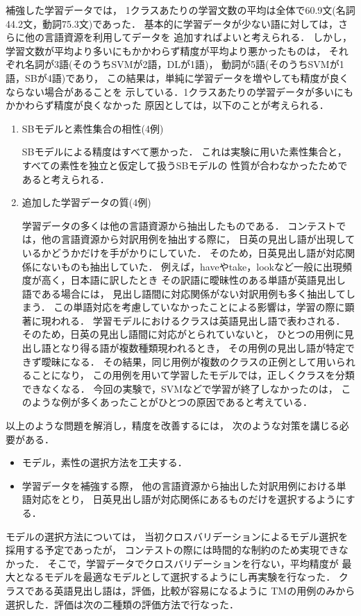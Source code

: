 補強した学習データでは，
1クラスあたりの学習文数の平均は全体で60.9文(名詞44.2文，動詞75.3文)であった．
基本的に学習データが少ない語に対しては，さらに他の言語資源を利用してデータを
追加すればよいと考えられる．
しかし，学習文数が平均より多いにもかかわらず精度が平均より悪かったものは，
それぞれ名詞が3語(そのうちSVMが2語，DLが1語)，
動詞が5語(そのうちSVMが1語，SBが4語)であり，
この結果は，単純に学習データを増やしても精度が良くならない場合があることを
示している．1クラスあたりの学習データが多いにもかかわらず精度が良くなかった
原因としては，以下のことが考えられる．
\begin{enumerate}
\item SBモデルと素性集合の相性(4例)
    
  SBモデルによる精度はすべて悪かった．
  これは実験に用いた素性集合と，すべての素性を独立と仮定して扱うSBモデルの
  性質が合わなかったためであると考えられる．

\item 追加した学習データの質(4例)

  学習データの多くは他の言語資源から抽出したものである．
  コンテストでは，他の言語資源から対訳用例を抽出する際に，
  日英の見出し語が出現しているかどうかだけを手がかりにしていた．
  そのため，日英見出し語が対応関係にないものも抽出していた．
  例えば，haveやtake，lookなど一般に出現頻度が高く，日本語に訳したとき
  その訳語に曖昧性のある単語が英語見出し語である場合には，
  見出し語間に対応関係がない対訳用例も多く抽出してしまう．
  この単語対応を考慮していなかったことによる影響は，学習の際に顕著に現われる．
  学習モデルにおけるクラスは英語見出し語で表わされる．
  そのため，日英の見出し語間に対応がとられていないと，
  ひとつの用例に見出し語となり得る語が複数種類現われるとき，
  その用例の見出し語が特定できず曖昧になる．
  その結果，同じ用例が複数のクラスの正例として用いられることになり，
  この用例を用いて学習したモデルでは，正しくクラスを分類できなくなる．
  今回の実験で，SVMなどで学習が終了しなかったのは，
  このような例が多くあったことがひとつの原因であると考えている．
\end{enumerate}
以上のような問題を解消し，精度を改善するには，
次のような対策を講じる必要がある．
\begin{itemize}
\item モデル，素性の選択方法を工夫する．
\item 学習データを補強する際，
  他の言語資源から抽出した対訳用例における単語対応をとり，
  日英見出し語が対応関係にあるものだけを選択するようにする．
\end{itemize}
モデルの選択方法については，
当初クロスバリデーションによるモデル選択を採用する予定であったが，
コンテストの際には時間的な制約のため実現できなかった．
そこで，学習データでクロスバリデーションを行ない，平均精度が
最大となるモデルを最適なモデルとして選択するようにし再実験を行なった．
クラスである英語見出し語は，評価，比較が容易になるように
TMの用例のみから選択した．評価は次の二種類の評価方法で行なった．

